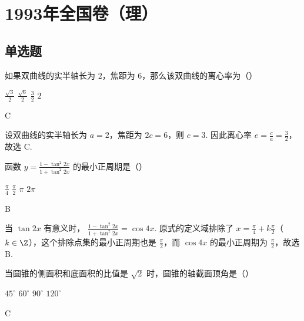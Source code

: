 \documentclass[UTF8,a4paper,oneside,11pt]{ctexbook}
\begin{document}
\mainmatter

\chapter{1993年全国卷（理）}
\section{单选题}

\begin{problem}
如果双曲线的实半轴长为 \(2\)，焦距为 \(6\)，那么该双曲线的离心率为（\quad）

\choices
    {\(\frac{\sqrt{3}}{2}\)}
    {\(\frac{\sqrt{6}}{2}\)}
    {\(\frac{3}{2}\)}
    {\(2\)}
\end{problem}

\begin{answer}
C
\end{answer}

\begin{solution}
设双曲线的实半轴长为 \(a=2\)，焦距为 \(2c=6\)，则 \(c=3\). 因此离心率
\(e=\frac{c}{a}=\frac{3}{2}\)，故选 C.
\end{solution}

\begin{problem}
函数 \(y = \frac{1 - \tan^2 2x}{1 + \tan^2 2x} \) 的最小正周期是（\quad）

\choices
    {\(\frac{\pi}{4}\)}
    {\(\frac{\pi}{2}\)}
    {\(\pi\)}
    {\(2\pi\)}
\end{problem}

\begin{answer}
B
\end{answer}

\begin{solution}
当 \(\tan 2x\) 有意义时，
\(\frac{1-\tan^2 2x}{1+\tan^2 2x}=\cos 4x\). 原式的定义域排除了
\(x=\frac{\pi}{4}+k\frac{\pi}{2}\)（\(k\in\Z\)），这个排除点集的最小正周期也是
\(\frac{\pi}{2}\)，而 \(\cos 4x\) 的最小正周期为 \(\frac{\pi}{2}\)，故选 B.
\end{solution}

\begin{problem}
当圆锥的侧面积和底面积的比值是 \(\sqrt{2}\) 时，圆锥的轴截面顶角是（\quad）

\choices
    {\(45^{\circ}\)}
    {\(60^{\circ}\)}
    {\(90^{\circ}\)}
    {\(120^{\circ}\)}
\end{problem}

\begin{answer}
C
\end{answer}
\end{document}
